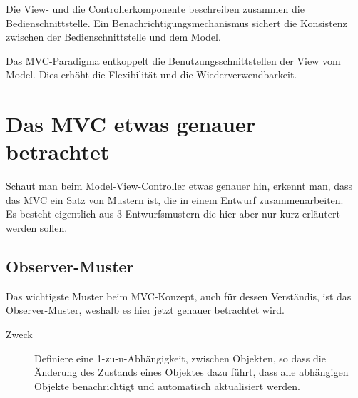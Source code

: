 \documentclass[11pt,a4paper,titlepage]{scrreprt}
\begin{document}
Die View- und die Controllerkomponente beschreiben zusammen die Bedienschnittstelle.
Ein Benachrichtigungsmechanismus sichert die Konsistenz zwischen der Bedienschnittstelle
und dem Model.

Das MVC-Paradigma entkoppelt die Benutzungsschnittstellen der View vom Model. Dies
erhöht die Flexibilität und die Wiederverwendbarkeit.

\section{Das MVC etwas genauer betrachtet}
Schaut man beim Model-View-Controller etwas genauer hin, erkennt man, dass das MVC
ein Satz von Mustern ist, die in einem Entwurf zusammenarbeiten.\\
Es besteht eigentlich aus 3 Entwurfsmustern die hier aber nur kurz erläutert werden
sollen.

\subsection{Observer-Muster}
Das wichtigste Muster beim MVC-Konzept, auch für dessen Verständis, ist das Observer-Muster,
weshalb es hier jetzt genauer betrachtet wird.

\begin{description}
\item[Zweck]
Definiere eine 1-zu-n-Abhängigkeit, zwischen Objekten, so dass die Änderung des
Zustands eines Objektes dazu führt, dass alle abhängigen Objekte benachrichtigt
und automatisch aktualisiert werden. \citep[S. 287]{Riehle200407}
\end{description}
\end{document}
